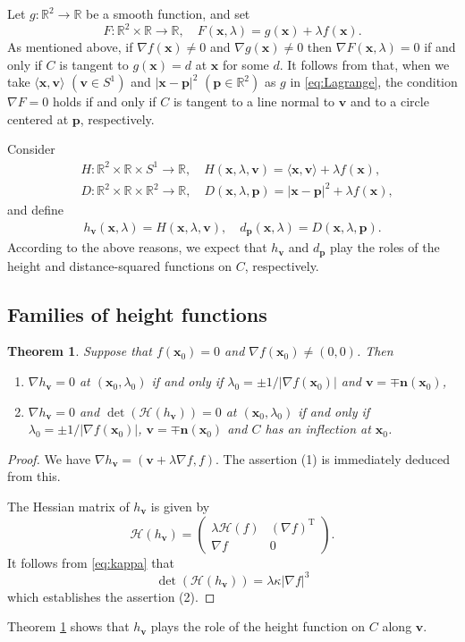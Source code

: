 \documentclass[10pt,a4paper]{amsart}
\newtheorem{theorem}{Theorem}[section]
\newcommand{\R}{\mathbb{R}}
\newcommand{\n}{\mathbf{n}}
\renewcommand{\v}{\mathbf{v}}
\newcommand{\x}{\mathbf{x}}
\newcommand{\p}{\mathbf{p}}
\begin{document}
Let $g:\R^2\to\R$ be a smooth function, and set
\begin{equation}
\label{eq:Lagrange}
F:\R^2\times\R\to\R,\quad F(\x,\lambda)=g(\x)+\lambda f(\x).
\end{equation}
As mentioned above, if $\nabla f(\x)\ne 0$ and $\nabla g(\x) \ne 0$ then $\nabla F(\x,\lambda) = 0$ if and only if $C$ is tangent to $g(\x)=d$ at $\x$ for some $d$. 
It follows from that, when we take $\langle \x, \v \rangle$ $(\v\in S^1)$ and $|\x-\p|^2$ $(\p\in\R^2)$ as $g$ in \eqref{eq:Lagrange}, the condition $\nabla F=0$ holds if and only if $C$ is tangent to a line normal to $\v$ and to a circle centered at $\p$, respectively.

Consider
\begin{align*}
&H:\R^2\times\R\times S^1 \to \R,\quad H(\x,\lambda,\v) = \langle \x,\v \rangle + \lambda f(\x),\\
&D:\R^2\times\R\times \R^2 \to \R,\quad D(\x,\lambda,\p)=|\x-\p|^2 + \lambda f(\x),
\end{align*}
and define
\begin{align*}
h_{\v}(\x,\lambda)=H(\x,\lambda,\v),\quad
d_{\p}(\x,\lambda)=D(\x,\lambda,\p).
\end{align*}
According to the above reasons, we expect that $h_{\v}$ and $d_{\p}$ play the roles of the height and distance-squared functions on $C$, respectively. 

\subsection{Families of height functions}

\begin{theorem}
\label{thm:height}
Suppose that $f(\x_0)=0$ and $\nabla f(\x_0)\ne(0,0)$. Then
\begin{enumerate}
\item 
$\nabla h_{\v}=0$ at $(\x_0,\lambda_0)$ if and only if $\lambda_0=\pm 1/|\nabla f(\x_0)|$ and $\v=\mp \n(\x_0)$,  
\item 
$\nabla h_{\v}=0$ and $\det(\mathcal{H}(h_{\v}))=0$ at $(\x_0,\lambda_0)$ if and only if $\lambda_0=\pm 1/|\nabla f(\x_0)|$, $\v=\mp \n(\x_0)$ and $C$ has an inflection at $\x_0$.
 \end{enumerate}
\end{theorem}
\begin{proof}
We have $\nabla h_\v = (\v + \lambda \nabla f, f)$.
The assertion (1) is immediately deduced from this.
 
The Hessian matrix of $h_\v$ is given by
\[
\mathcal{H}(h_\v)
= 
\begin{pmatrix}
\lambda \mathcal{H}(f) & (\nabla f)^\mathrm{T} \\
\nabla f & 0
\end{pmatrix}.
\]
It follows from \eqref{eq:kappa} that
$$
\det(\mathcal{H}(h_\v)) = \lambda \kappa|\nabla f|^3 
$$
which establishes the assertion (2).
\end{proof}
Theorem \ref{thm:height} shows that $h_{\v}$ plays the role of the height function on $C$ along $\v$.
\end{document}
